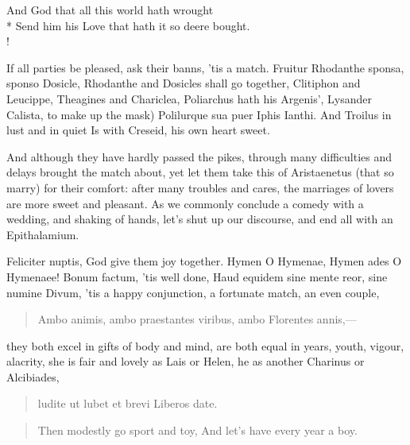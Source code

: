 {\gothfont%
\begin{versewithlinenos}{2}{1}{1}%
And God that all this world hath wrought\\*
Send him his Love that hath it so deere bought.\\!
\end{versewithlinenos}%
}%

If all parties be pleased, ask their banns, 'tis a match. Fruitur
Rhodanthe sponsa, sponso Dosicle, Rhodanthe and Dosicles shall go
together, Clitiphon and Leucippe, Theagines and Chariclea, Poliarchus
hath his Argenis', Lysander Calista, to make up the mask)
Polilurque sua puer Iphis Ianthi.
And Troilus in lust and in quiet
Is with Creseid, his own heart sweet.

And although they have hardly passed the pikes, through many
difficulties and delays brought the match about, yet let them take this
of  Aristaenetus (that so marry) for their comfort: after
many troubles and cares, the marriages of lovers are more sweet and
pleasant. As we commonly conclude a comedy with a wedding, and
shaking of hands, let's shut up our discourse, and end all with an
Epithalamium.

Feliciter nuptis, God give them joy together. Hymen O Hymenae,
Hymen ades O Hymenaee! Bonum factum, 'tis well done, Haud equidem sine
mente reor, sine numine Divum, 'tis a happy conjunction, a fortunate
match, an even couple,

\begin{latin}
\begin{verse}
Ambo animis, ambo praestantes viribus, ambo
Florentes annis,---
\end{verse}
\end{latin}

they both excel in gifts of body and mind, are both equal in years,
youth, vigour, alacrity, she is fair and lovely as Lais or Helen, he as
another Charinus or Alcibiades,

\begin{latin}
\begin{verse}
ludite ut lubet et brevi
Liberos date.
\end{verse}
\end{latin}
\translationrule%
\begin{verse}%
Then modestly go sport and toy,
And let's have every year a boy.
\end{verse}%

